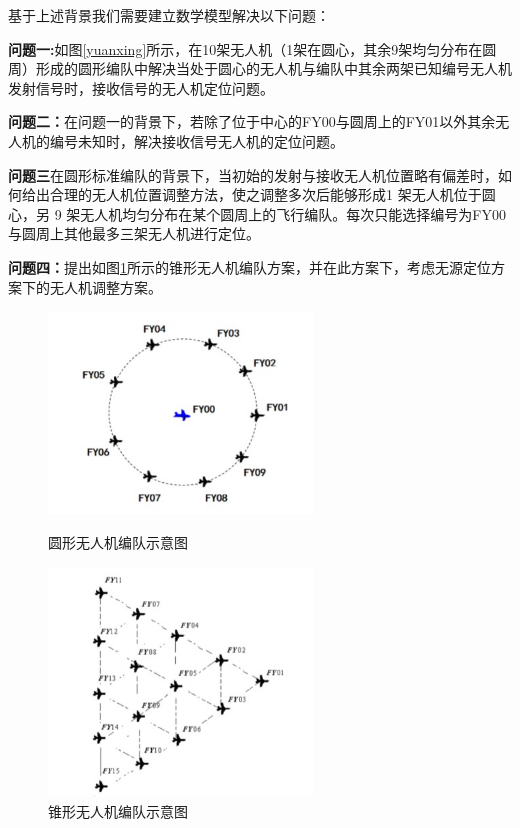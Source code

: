 \documentclass{my_paper}
\begin{document}
基于上述背景我们需要建立数学模型解决以下问题：

\textbf{问题一:}如图\ref{yuanxing}所示，在10架无人机（1架在圆心，其余9架均匀分布在圆周）形成的圆形编队中解决当处于圆心的无人机与编队中其余两架已知编号无人机发射信号时，接收信号的无人机定位问题。

\textbf{问题二：}在问题一的背景下，若除了位于中心的FY00与圆周上的FY01以外其余无人机的编号未知时，解决接收信号无人机的定位问题。

\textbf{问题三}在圆形标准编队的背景下，当初始的发射与接收无人机位置略有偏差时，如何给出合理的无人机位置调整方法，使之调整多次后能够形成1 架无人机位于圆心，另 9 架无人机均匀分布在某个圆周上的飞行编队。每次只能选择编号为FY00与圆周上其他最多三架无人机进行定位。

\textbf{问题四：}提出如图\ref{zhuixing}所示的锥形无人机编队方案，并在此方案下，考虑无源定位方案下的无人机调整方案。

\begin{figure}[htbp]
    \centering
    \begin{minipage}[t]{0.48\textwidth}
        \centering
        \includegraphics[width=7cm]{images/yuanxing.jpg}
        \caption{圆形无人机编队示意图}
        \label{yuanxing}
    \end{minipage}
    \begin{minipage}[t]{0.48\textwidth}
        \centering
        \includegraphics[width=7cm]{images/zhuixing.jpg}
        \caption{锥形无人机编队示意图}
        \label{zhuixing}
    \end{minipage}
\end{figure}
\end{document}
